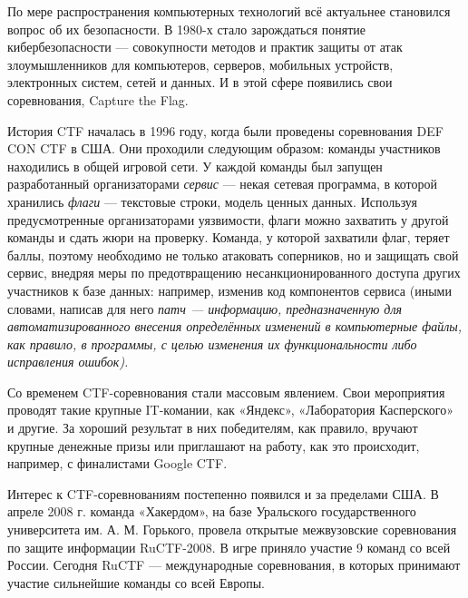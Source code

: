 По мере распространения компьютерных технологий всё актуальнее становился вопрос об их безопасности. В 1980-х стало зарождаться понятие кибербезопасности\cite{InfosecHistory} --- совокупности методов и практик защиты от атак злоумышленников для компьютеров, серверов, мобильных устройств, электронных систем, сетей и данных. И в этой сфере появились свои соревнования, Capture the Flag.



История CTF началась в 1996 году, когда были проведены соревнования DEF CON CTF в США\cite{Defcon}. Они проходили следующим образом: команды участников находились в общей игровой сети. У каждой команды был запущен разработанный организаторами \textit{сервис} — некая сетевая программа, в которой хранились \textit{флаги} — текстовые строки, модель ценных данных. Используя предусмотренные организаторами уязвимости, флаги можно захватить у другой команды и сдать жюри на проверку. Команда, у которой захватили флаг, теряет баллы, поэтому необходимо не только атаковать соперников, но и защищать свой сервис, внедряя меры по предотвращению несанкционированного доступа других участников к базе данных: например, изменив код компонентов сервиса (иными словами, написав для него \textit{патч --- информацию, предназначенную для автоматизированного внесения определённых изменений в компьютерные файлы, как правило, в программы, с целью изменения их функциональности либо исправления ошибок).}


Со временем CTF-соревнования стали массовым явлением. Свои мероприятия проводят такие крупные IT-комании, как «Яндекс»\cite{YaCTF}, «Лаборатория Касперского»\cite{KasperskyCTF} и другие. За хороший результат в них победителям, как правило, вручают крупные денежные призы\cite{FBCTF} или приглашают на работу, как это происходит, например, с финалистами Google CTF\cite{GoogleCTF}.

Интерес к CTF-соревнованиям постепенно появился и за пределами США. В апреле 2008 г. команда «Хакердом», на базе Уральского государственного университета им. А. М. Горького, провела открытые межвузовские соревнования по защите информации RuCTF-2008. В игре приняло участие 9 команд со всей России\cite{Hackerdom08}. Сегодня RuCTF --- международные соревнования, в которых принимают участие сильнейшие команды со всей Европы\cite{Hackerdom20}.

